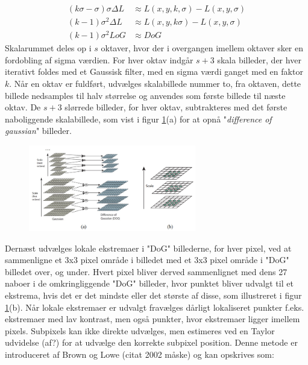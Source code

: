 \begin{equation}
\begin{split}
(k\sigma-\sigma)\sigma\Delta L &\approx L(x,y,k,\sigma)-L(x,y,\sigma) \\
(k-1)\sigma^2\Delta L &\approx L(x,y,k\sigma)-L(x,y,\sigma) \\
(k-1)\sigma^2LoG &\approx DoG
\end{split}
\end{equation}
Skalarummet deles op i $s$ oktaver, hvor der i overgangen imellem oktaver sker en fordobling af sigma værdien. For hver oktav indgår $s+3$ skala billeder, der hver iterativt foldes med et Gaussisk filter, med en sigma værdi ganget med en faktor $k$. Når en oktav er fuldført, udvælges skalabillede nummer to, fra oktaven, dette billede nedsamples til halv størrelse og anvendes som første billede til næste oktav. De $s+3$ slørrede billeder, for hver oktav, subtrakteres med det første naboliggende skalabillede, som vist i figur \ref{fig:difference}(a) for at opnå "\textit{difference of gaussian}" billeder.
\begin{figure}[H]
    \centering
    \includegraphics[width=0.65\textwidth]{fig/30.png}
     \vspace{-1em}
    \begin{center}    
       \caption{\textcolor{gray}{\footnotesize \textit{ }}}
    \label{fig:difference}
     \end{center}
     \vspace{-2.5em}
  \end{figure} \noindent
Dernæst udvælges lokale ekstremaer i "DoG" billederne, for hver pixel, ved at sammenligne et 3x3 pixel område i billedet med et 3x3 pixel område i "DoG" billedet over, og under. Hvert pixel bliver derved sammenlignet med dens 27 naboer i de omkringliggende "DoG" billeder, hvor punktet bliver udvalgt til et ekstrema, hvis det er det mindste eller det største af disse, som illustreret i figur \ref{fig:difference}(b). Når lokale ekstremaer er udvalgt fravælges dårligt lokaliseret punkter f.eks. ekstremaer med lav kontrast, men også punkter, hvor ekstremaer ligger imellem pixels. Subpixels kan ikke direkte udvælges, men estimeres ved en Taylor udvidelse (af?) for at udvælge den korrekte subpixel position. Denne metode er introduceret af Brown og Lowe (citat 2002 måske) og kan opskrives som:
